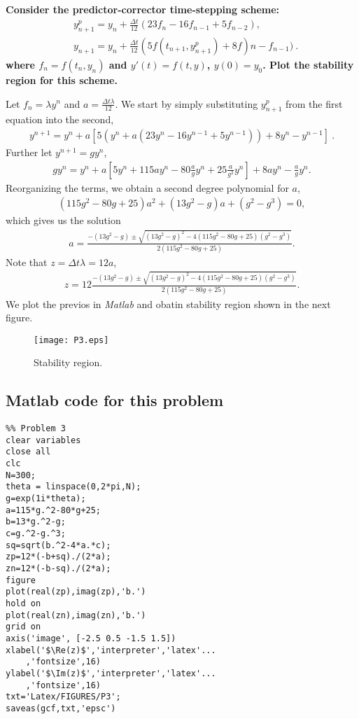 \textbf{Consider the predictor-corrector time-stepping scheme:}
\begin{align*}
& y_{n+1}^p = y_n + \frac{\Delta t}{12}(23f_n - 16f_{n-1}+5f_{n-2}), \\
&y_{n+1} = y_n + \frac{\Delta t}{12}(5f(t_{n+1},y_{n+1}^p) + 8f)n - f_{n-1})~.
\end{align*}
\textbf{where $f_n = f(t_n,y_n)$ and $y'(t) = f(t,y)$, $y(0) = y_0$. Plot the stability region for this scheme.}

Let $f_n = \lambda y^{n}$ and $a = \frac{\Delta t \lambda}{12}$. We start by simply substituting $y_{n+1}^p$ from the first equation into the second,
\begin{align*}
y^{n+1} = y^n + a \left[ 5(y^n + a(23y^n- 16y^{n-1}+5y^{n-1})) + 8y^n - y^{n-1} \right]~.
\end{align*} 
Further let $y^{n+1} = gy^n$,
\begin{align*}
gy^n = y^n +a\left[ 5y^n + 115ay^n - 80\frac{a}{g}y^n + 25\frac{a}{g^2}y^n\right] + 8ay^n - \frac{a}{g}y^n.
\end{align*}
Reorganizing the terms, we obtain a second degree polynomial for $a$,
\begin{align*}
(115g^2 - 80g +25)a^2 + (13g^2-g)a + (g^2-g^3) = 0,
\end{align*}
which gives us the solution
\begin{align*}
a = \frac{-(13g^2 - g) \pm \sqrt{(13g^2-g)^2 - 4(115g^2 - 80g+25)(g^2-g^3)}}{2(115g^2 - 80g +25)}.
\end{align*}
Note that $z =\Delta t\lambda= 12a$, 
\begin{align*}
z =12 \frac{-(13g^2 - g) \pm \sqrt{(13g^2-g)^2 - 4(115g^2 - 80g+25)(g^2-g^3)}}{2(115g^2 - 80g +25)}.
\end{align*}
We plot the previos in \textsl{Matlab} and obatin stability region shown in the next figure.

\begin{figure}[H]
\centering     %
{\texttt{[image: P3.eps]}}
\caption{Stability region.}
\end{figure}

\subsection*{Matlab code for this problem}
\begin{verbatim}
%% Problem 3
clear variables
close all
clc
N=300;
theta = linspace(0,2*pi,N);
g=exp(1i*theta);
a=115*g.^2-80*g+25;
b=13*g.^2-g;
c=g.^2-g.^3;
sq=sqrt(b.^2-4*a.*c);
zp=12*(-b+sq)./(2*a);
zn=12*(-b-sq)./(2*a);
figure
plot(real(zp),imag(zp),'b.')
hold on
plot(real(zn),imag(zn),'b.')
grid on
axis('image', [-2.5 0.5 -1.5 1.5])
xlabel('$\Re(z)$','interpreter','latex'...
    ,'fontsize',16)
ylabel('$\Im(z)$','interpreter','latex'...
    ,'fontsize',16)
txt='Latex/FIGURES/P3';
saveas(gcf,txt,'epsc')
\end{verbatim}